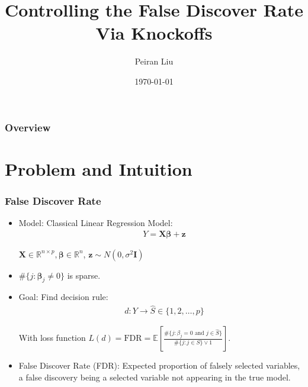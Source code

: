 \documentclass{beamer}
\title[]{Controlling the False Discover Rate Via Knockoffs} %
\author{Peiran Liu} %
\institute[] %
{
By Rina Foygel Barber and Emmanuel J. Cand\`{e}s \\
University of Chicago and Stanford University \\ %
\medskip
}
\date{\today} %
\begin{document}
\begin{frame}
\titlepage %
\end{frame}

\begin{frame}
\frametitle{Overview} %
\tableofcontents %
\end{frame}


\section{Problem and Intuition} %
\begin{frame}
\frametitle{False Discover Rate}
\begin{itemize}
\item Model: Classical Linear Regression Model:
\begin{align*}
& Y = \bm{X}\bm{\beta} + \bm{z}
\end{align*}

$\bm{X}\in \mathbb{R}^{n\times p}, \bm{\beta} \in \mathbb{R}^n$, $\bm{z} \sim N(0, \sigma^2\bm{I})$
\item $\#\{j: \bm{\beta}_j \neq 0 \}$ is sparse. 
\item Goal: Find decision rule:
\begin{align*}
& d: Y \rightarrow \hat S\in \{1,2,\dots, p\}
\end{align*}

With loss function $L(d) = \text{FDR} = \mathbb{E}\left[\frac{\#\{j:\beta_j =0 \text{ and }j\in \hat{S} \} }{\#\{j:j\in S\}\vee 1 } \right]$.

\item False Discover Rate (FDR): Expected proportion of falsely selected variables, a false discovery being a selected variable not appearing in the true model.
\end{itemize}
\end{frame}
\end{document}
